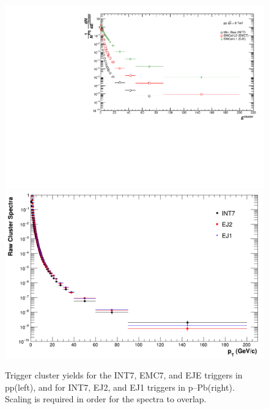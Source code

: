 \documentclass[ALICE]{ALICE_analysis_notes}
\newcommand{\pPb}{{\mbox{p--Pb}}\xspace}
\newcommand{\pp}{pp\xspace}
\begin{document}
\begin{figure}
    \centering
    \includegraphics[width=15cm]{figures/TriggerClusters/clusters_R02.pdf}
    \includegraphics[width=15cm]{figures/pPbFigures/TriggerClusters/rawclusterspectra_alltriggers_R02.png}
    \caption{Trigger cluster yields for the INT7, EMC7, and EJE triggers in \pp (left), and for INT7, EJ2, and EJ1 triggers in \pPb (right). Scaling is required in order for the spectra to overlap.}
    \label{fig:triggerClusters}
\end{figure}
\end{document}
